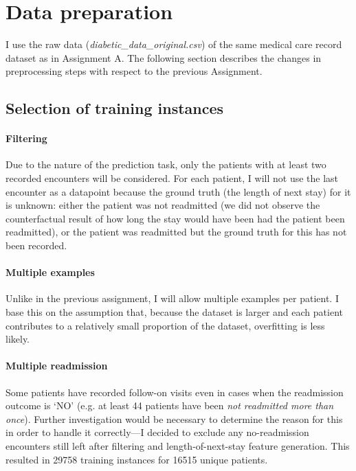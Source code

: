 \documentclass[10pt, twocolumn]{article}
\begin{document}
\thispagestyle{first}
\pagestyle{plain}


\section{Data preparation}

I use the raw data (\textit{diabetic\_data\_original.csv}) of the same medical care record dataset \cite{strack2014dataset} as in Assignment A. The following section describes the changes in preprocessing steps with respect to the previous Assignment.

\subsection{Selection of training instances}
\paragraph{Filtering}
Due to the nature of the prediction task, only the patients with at least two recorded encounters will be considered. For each patient, I will not use the last encounter as a datapoint because the ground truth (the length of next stay) for it is unknown: either the patient was not readmitted (we did not observe the counterfactual result of how long the stay would have been had the patient been readmitted), or the patient was readmitted but the ground truth for this has not been recorded. 

\paragraph{Multiple examples} Unlike in the previous assignment, I will allow multiple examples per patient. I base this on the assumption that, because the dataset is larger and each patient contributes to a relatively small proportion of the dataset, overfitting is less likely.

\paragraph{Multiple readmission} Some patients have recorded follow-on visits even in cases when the readmission outcome is `NO' (e.g. at least 44 patients have been \textit{not readmitted more than once}). Further investigation would be necessary to determine the reason for this in order to handle it correctly—I decided to exclude any no-readmission encounters still left after filtering and length-of-next-stay feature generation. This resulted in 29758 training instances for 16515 unique patients.
\end{document}
